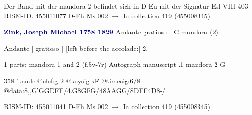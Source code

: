 \documentclass[twocolumn]{book}
\begin{document}
\newline Der Band mit der mandora 2 befindet sich in D Eu mit der Signatur Esl VIII 403
\newline RISM-ID: 455011077
\newline D-Fh  Ms 002
\newline $\rightarrow$ In collection 419 (455008345)
      
\newline \par \vspace{7pt} \textcolor{darkblue}{\textbf{Zink, Joseph Michael  1758-1829}}
\newline Andante gratioso - G
\newline mandora (2)
\newline \begin{itshape} Andante | gratioso | [left before the accolade:] 2.\end{itshape} 
\newline \textcolor{darkblue}{}  1 parts: mandora 1 and 2  (f.5v-7r)
\newline Autograph manuscript
.1  mandora 2  G  
\begin{filecontents*}{358-1.code}
@clef:g-2
@keysig:xF
@timesig:6/8
@data:8,,G'GGDFF/4.G8GFG/48AAGG/8DFF4D8-/
\end{filecontents*}
\newline
%

\newline RISM-ID: 455011041
\newline D-Fh  Ms 002
\newline $\rightarrow$ In collection 419 (455008345)
      
\end{document}
